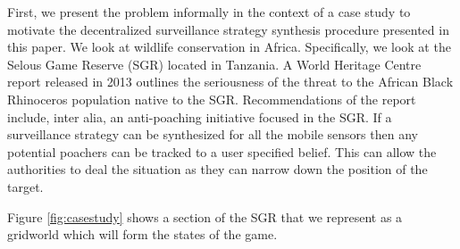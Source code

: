First, we present the problem informally in the context of a case study to motivate the decentralized surveillance strategy synthesis procedure presented in this paper. We look at wildlife conservation in Africa. Specifically, we look at the Selous Game Reserve (SGR) located in Tanzania. A World Heritage Centre report released in 2013 \cite{UN13} outlines the seriousness of the threat to the African Black Rhinoceros population native to the SGR. Recommendations of the report include, inter alia, an anti-poaching initiative focused in the SGR. If a surveillance strategy can be synthesized for all the mobile sensors then any potential poachers can be tracked to a user specified belief. This can allow the authorities to deal the situation as they can narrow down the position of the target. 

Figure \ref{fig:casestudy} shows a section of the SGR that we represent as a gridworld which will form the states of the game. 


